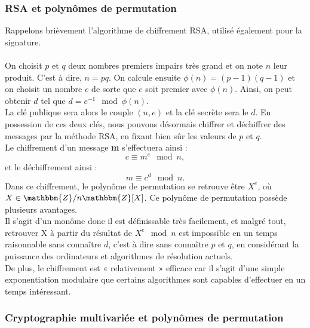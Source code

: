 \documentclass[12pt]{article}
\theoremstyle{remark}\newtheorem{note}{Note}
\theoremstyle{remark}\newtheorem{nota}{Notation}
\newcommand{\Z}{\mathbbm{Z}}
\theoremstyle{definition}
\begin{document}
\subsubsection{RSA et polynômes de permutation}
Rappelons brièvement l'algorithme de chiffrement RSA, utilisé également pour la signature.\\\\
On choisit $p$ et $q$ deux nombres premiers impairs très grand et on note $n$ leur produit. C'est à dire, $n=pq$. On calcule ensuite $\phi(n)=(p-1)(q-1)$ et on choisit un nombre $e$ de sorte que $e$ soit premier avec $\phi(n)$. Ainsi, on peut obtenir $d$ tel que $d=e^{-1} \mod \phi(n)$.\\
La clé publique sera alors le couple $(n,e)$ et la clé secrète sera le $d$. En possession de ces deux clés, nous pouvons désormais chiffrer et déchiffrer des messages par la méthode RSA, en fixant bien sûr les valeurs de $p$ et $q$.\\
Le chiffrement d'un message \textbf{m} s'effectuera ainsi : 
$$c\equiv m^e \mod n,$$
et le déchiffrement ainsi :
$$m\equiv c^d \mod n.$$
Dans ce chiffrement, le polynôme de permutation se retrouve être $X^e$, où $X \in \Z/n\Z[X]$. Ce polynôme de permutation possède plusieurs avantages. \\
Il s'agit d'un monôme donc il est définissable très facilement, et malgré tout, retrouver X à partir du résultat de $X^e \mod n$ est impossible en un temps raisonnable sans connaître $d$, c'est à dire sans connaître $p$ et $q$, en considérant la puissance des ordinateurs et algorithmes de résolution actuels.\\
De plus, le chiffrement est « relativement » efficace car il s'agit d'une simple exponentiation modulaire que certains algorithmes sont capables d'effectuer en un temps intéressant.

\subsubsection{Cryptographie multivariée et polynômes de permutation}
\end{document}
